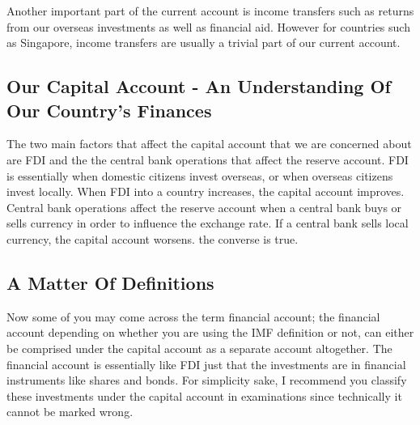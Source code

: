 Another important part of the current account is income transfers such as returns from our overseas investments as well as financial aid. However for countries such as Singapore, income transfers are usually a trivial part of our current account.
\subsection{Our Capital Account - An Understanding Of Our Country's Finances}
The two main factors that affect the capital account that we are concerned about are FDI and the the central bank operations that affect the reserve account. FDI is essentially when domestic citizens invest overseas, or when overseas citizens invest locally. When FDI into a country increases, the capital account improves. Central bank operations affect the reserve account when a central bank buys or sells currency in order to influence the exchange rate. If a central bank sells local currency, the capital account worsens. the converse is true.
\subsection{A Matter Of Definitions}
Now some of you may come across the term financial account; the financial account depending on whether you are using the IMF definition or not, can either be comprised under the capital account as a separate account altogether. The financial account is essentially like FDI just that the investments are in financial instruments like shares and bonds. For simplicity sake, I recommend you classify these investments under the capital account in examinations since technically it cannot be marked wrong.

